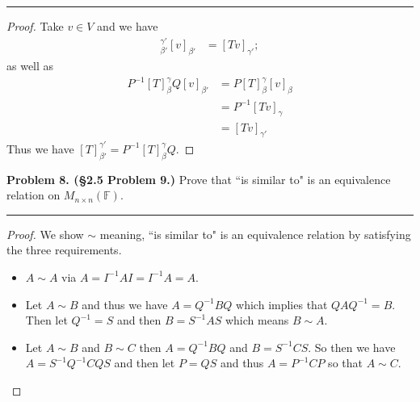 \documentclass[leqno]{article}
\theoremstyle{nonumberplain}
\newtheorem{proof}{Proof}
\begin{document}
\noindent\rule[0.5ex]{\linewidth}{1pt}

\begin{proof}
Take $v\in V$ and we have
\begin{align*}
[T]_{\beta'}^{\gamma'}[v]_{\beta'}&=[Tv]_{\gamma'};
\end{align*}
as well as
\begin{align*}
P^{-1}[T]_\beta^\gamma Q [v]_{\beta'}&=P[T]_\beta^\gamma [v]_\beta\\
&=P^{-1}[Tv]_\gamma\\
&=[Tv]_{\gamma'}
\end{align*}
Thus we have $[T]_{\beta'}^{\gamma'}=P^{-1}[T]_\beta^\gamma Q$.  
\end{proof}

\pagebreak




\noindent\textbf{Problem 8. (\S 2.5 Problem 9.)} Prove that ``is similar to" is an equivalence relation on $M_{n\times n}(\mathbb{F})$. 

\noindent\rule[0.5ex]{\linewidth}{1pt}

\begin{proof}
We show $\sim$ meaning, ``is similar to" is an equivalence relation by satisfying the three requirements.
\begin{itemize}
\item $A\sim A$ via $A=I^{-1}AI=I^{-1}A=A$.  
\item Let $A\sim B$ and thus we have $A=Q^{-1}BQ$ which implies that $QAQ^{-1}=B$.  Then let $Q^{-1}=S$ and then $B=S^{-1}AS$ which means $B\sim A$.
\item Let $A\sim B$ and $B\sim C$ then $A=Q^{-1}BQ$ and $B=S^{-1}CS$.  So then we have $A=S^{-1}Q^{-1}CQS$ and then let $P=QS$ and thus $A=P^{-1}CP$ so that $A\sim C$.
\end{itemize}
\end{proof}

\pagebreak


\end{document}
